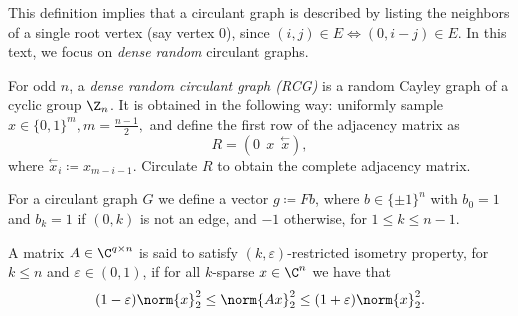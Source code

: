 This definition implies that a circulant graph is described by listing the neighbors of a single root vertex (say vertex $0$), since $(i,j)\in E \iff (0,i-j)\in E.$
In this text, we focus on \emph{dense random} circulant graphs.
    \begin{definition}
    \label{def:rand_circ}
    For odd \(n\), a \emph{dense random circulant graph (RCG)} is a random Cayley graph of a cyclic group \(\Z_n\). It is obtained in the following way: uniformly sample \(x \in \{0, 1\}^m, m={\frac{n - 1}{2}},\) and define the first row of the adjacency matrix as
    \begin{equation}
        R = (0\ \ x\ \ \overset{\leftarrow}{x}),
    \end{equation}
    where \(\overset{\leftarrow}{x}_i \coloneqq x_{m-i-1}\). Circulate $R$ to obtain the complete adjacency matrix.
    \end{definition}

For a circulant graph \(G\) we define a vector \(g \coloneqq Fb\), where \(b \in \{\pm 1\}^{n}\) with $b_0=1$ and \(b_k = 1\) if \((0, k)\) is not an edge, and \(-1\) otherwise, for $1 \le k \le n-1$.

\begin{definition}
\label{def:rip}
    A matrix \(A \in \C^{q \times n}\) is said to satisfy \((k, \varepsilon)\)-restricted isometry property, for \(k \leq n\) and \(\varepsilon \in (0, 1)\), if for all \(k\)-sparse \(x \in \C^{n}\) we have that 
    \begin{equation}
        (1 - \varepsilon) \norm{x}_2^2 \leq \norm{Ax}_2^2 \leq (1 + \varepsilon) \norm{x}_2^2. 
    \end{equation}
\end{definition}